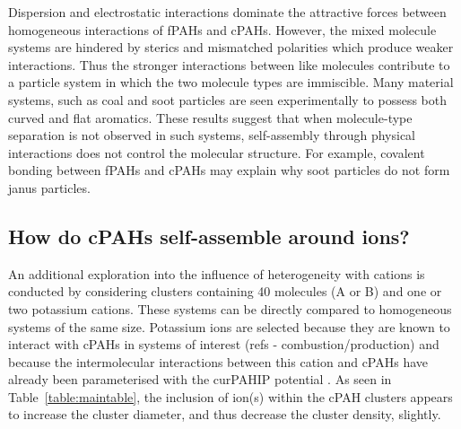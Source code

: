 Dispersion and electrostatic interactions dominate the attractive forces between homogeneous interactions of fPAHs and cPAHs. However, the mixed molecule systems are hindered by sterics and mismatched polarities which produce weaker interactions. Thus the stronger interactions between like molecules contribute to a particle system in which the two molecule types are immiscible. Many material systems, such as coal and soot particles are seen experimentally to possess both curved and flat aromatics. These results suggest that when molecule-type separation is not observed in such systems, self-assembly through physical interactions does not control the molecular structure. For example, covalent bonding between fPAHs and cPAHs may explain why soot particles do not form janus particles.




\subsection{How do cPAHs self-assemble around ions?} %
An additional exploration into the influence of heterogeneity with cations is conducted by considering clusters containing 40 molecules (A or B) and one or two potassium cations.  These systems can be directly compared to homogeneous systems of the same size. Potassium ions are selected because they are known to interact with cPAHs in systems of interest (refs - combustion/production) and because the intermolecular interactions between this cation and cPAHs have already been parameterised with the curPAHIP potential \cite{bowal2019ion}. As seen in Table~\ref{table:maintable},
the inclusion of ion(s) within the cPAH clusters appears to increase the cluster diameter, and thus decrease the cluster density, slightly.

